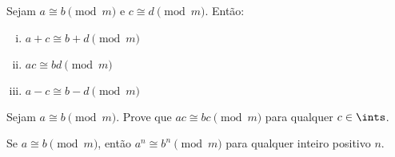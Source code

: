 \begin{exercise}
%
Sejam $a\cong b\pmod m$ e $c\cong d\pmod m$. Então:
    \begin{enumerate}[(i)]
        \item $a + c\cong b + d\pmod m$
        \item $ac\cong bd\pmod m$
        \item $a - c\cong b - d\pmod m$
    \end{enumerate}
\end{exercise}

\begin{exercise}
%
Sejam $a\cong b\pmod m$. Prove que $ac\cong bc\pmod m$ para qualquer $c\in\ints$.
\end{exercise}

\begin{exercise}
%
Se $a\cong b\pmod m$, então $a^n\cong b^n\pmod m$ para qualquer inteiro positivo $n$.
\end{exercise}
